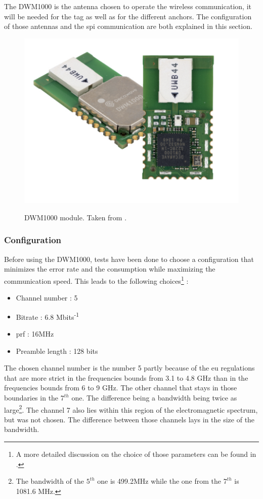 The DWM1000 is the antenna chosen to operate the wireless communication, it will be needed for the tag as well as for the different anchors. The configuration of those antennas and the \gls{spi} communication are both explained in this section.

\begin{figure}[H]
	\centering
	\includegraphics[width=.3\linewidth]{Images/DWM1000.png}
	\label{fig:dwm1000}
	\caption{DWM1000 module. Taken from \cite{decawave}.}
\end{figure}

\subsubsection{Configuration}

Before using the DWM1000, tests have been done to choose a configuration that minimizes the error rate and the consumption while maximizing the communication speed. This leads to the following choices\footnote{A more detailed discussion on the choice of those parameters can be found in \cite{hannotier2019indoor}.} :

\begin{itemize}
\item Channel number : 5
\item Bitrate : 6.8 Mbits\textsuperscript{-1}
\item \gls{prf} : 16MHz
\item Preamble length : 128 bits
\end{itemize}

The chosen channel number is the number 5 partly because of the \gls{eu} regulations that are more strict in the frequencies bounds from 3.1 to 4.8 GHz than in the frequencies bounds from 6 to 9 GHz\cite{eulaw}. The other channel that stays in those boundaries in the $7^{th}$ one. The difference being a bandwidth being twice as large\footnote{The bandwidth of the $5^{th}$ one is 499.2MHz while the one from the $7^{th}$ is 1081.6 MHz.}. The channel 7 also lies within this region of the electromagnetic spectrum, but was not chosen. The difference between those channels lays in the size of the bandwidth.
\vspace{2mm}

